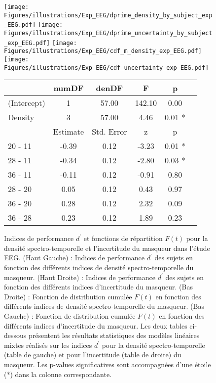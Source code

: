 \begin{figure*}[!t]
\texttt{[image: Figures/illustrations/Exp\_EEG/dprime\_density\_by\_subject\_exp\_EEG.pdf]}
\texttt{[image: Figures/illustrations/Exp\_EEG/dprime\_uncertainty\_by\_subject\_exp\_EEG.pdf]}
\texttt{[image: Figures/illustrations/Exp\_EEG/cdf\_m\_density\_exp\_EEG.pdf]}
\texttt{[image: Figures/illustrations/Exp\_EEG/cdf\_uncertainty\_exp\_EEG.pdf]}
\caption[Indices de performance et fonctions de répartition de l'étude EEG.]{
Indices de performance $d^\prime$ et fonctions de répartition $F(t)$ pour la densité spectro-temporelle et l'incertitude du masqueur dans l'étude EEG. 
(Haut Gauche) : Indices de performance $d^\prime$ des sujets en fonction des différents indices de densité spectro-temporelle du masqueur. 
(Haut Droite) : Indices de performance $d^\prime$ des sujets en fonction des différents indices d'incertitude du masqueur.
(Bas Droite) : Fonction de distribution cumulée $F(t)$ en fonction des différents indices de densité spectro-temporelle du masqueur. 
(Bas Gauche) : Fonction de distribution cumulée $F(t)$ en fonction des différents indices d'incertitude du masqueur.
Les deux tables ci-dessous présentent les résultats statistiques des modèles linéaires mixtes réalisés sur les indices $d^\prime$ pour la densité spectro-temporelle (table de gauche) et pour l'incertitude (table de droite) du masqueur. 
Les p-values significatives sont accompagnées d'une étoile (*) dans la colonne correspondante.}
\label{fig:figure5resultatscomportementaux2}

\bigskip

\scriptsize
\begin{multicols}{2}
\begin{tabular}{|l||*{5}{c|}}
\hline
& numDF & denDF & F & p \\ 
\hline
(Intercept) & 1 & 57.00 & 142.10 & 0.00 \\ 
Density & 3 & 57.00 & 4.46 & 0.01 *\\ 
\hline
& Estimate & Std. Error & z & p \\ 
\hline
20 - 11 & -0.39 & 0.12 & -3.23 & 0.01 *\\ 
28 - 11 & -0.34 & 0.12 & -2.80 & 0.03 *\\ 
36 - 11 & -0.11 & 0.12 & -0.91 & 0.80 \\ 
28 - 20 & 0.05 & 0.12 & 0.43 & 0.97 \\ 
36 - 20 & 0.28 & 0.12 & 2.32 & 0.09 \\ 
36 - 28 & 0.23 & 0.12 & 1.89 & 0.23 \\ 
\hline
\end{tabular}


\end{multicols}
\end{figure*}
